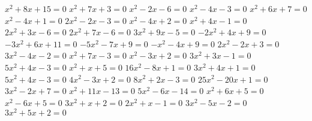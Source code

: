 \documentclass[twocolumns,12pt,addpoints,x11names]{exam}
\begin{document}
\begin{multicols}{2}
\begin{questions}
  \question $x^{2}+8x+15=0$
  \question $x^{2}+7x+3=0$
  \question $x^{2}-2x-6=0$
  \question $x^{2}-4x-3=0$
  \question $x^{2}+6x+7=0$
  \question $x^{2}-4x+1=0$
  \question $2x^{2}-2x-3=0$
  \question $x^{2}-4x+2=0$
  \question $x^{2}+4x-1=0$
  \question $2x^{2}+3x-6=0$
  \question $2x^{2}+7x-6=0$
  \question $3x^{2}+9x-5=0$
  \question $-2x^{2}+4x+9=0$
  \question $-3x^{2}+6x+11=0$
  \question $-5x^{2}-7x+9=0$
  \question $-x^{2}-4x+9=0$
  \question $2x^{2}-2x+3=0$
  \question $3x^{2}-4x-2=0$
  \question $x^{2}+7x-3=0$
  \question $x^{2}-3x+2=0$
  \question $3x^{2}+3x-1=0$
  \question $5x^{2}+4x-3=0$
  \question $x^{2}+x+5=0$
  \question $16x^{2}-8x+1=0$
  \question $3x^{2}+4x+1=0$
  \question $5x^{2}+4x-3=0$
  \question $4x^{2}-3x+2=0$
  \question $8x^{2}+2x-3=0$
  \question $25x^{2}-20x+1=0$
  \question $3x^{2}-2x+7=0$
  \question $x^{2}+11x-13=0$
  \question $5x^{2}-6x-14=0$
  \question $x^{2}+6x+5=0$
  \question $x^{2}-6x+5=0$
  \question $3x^{2}+x+2=0$
  \question $2x^{2}+x-1=0$
  \question $3x^{2}-5x-2=0$
  \question $3x^{2}+5x+2=0$
 













\end{questions}
\end{multicols}
\end{document}
